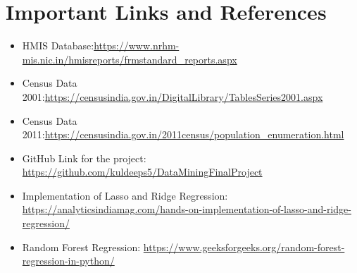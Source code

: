 \documentclass[]{article}
\begin{document}
\section{Important Links and References}
\begin{itemize}
\item HMIS Database:\url{https://www.nrhm-mis.nic.in/hmisreports/frmstandard_reports.aspx}
\item Census Data 2001:\url{https://censusindia.gov.in/DigitalLibrary/TablesSeries2001.aspx}
\item Census Data 2011:\url{https://censusindia.gov.in/2011census/population_enumeration.html}
\item GitHub Link for the project: \url{https://github.com/kuldeeps5/DataMiningFinalProject}
\item Implementation of Lasso and Ridge Regression: \\\url{https://analyticsindiamag.com/hands-on-implementation-of-lasso-and-ridge-regression/}
\item Random Forest Regression: \url{https://www.geeksforgeeks.org/random-forest-regression-in-python/}
\end{itemize}

   
\end{document}
